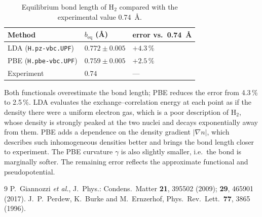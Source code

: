 \documentclass[11pt,a4paper]{article}
\begin{document}
\begin{table}[htb]
\centering
\caption{Equilibrium bond length of H$_2$ compared with the experimental value
\SI{0.74}{\angstrom}.}
\label{tab:compare}
\small
\begin{tabular}{l l l}
\toprule
Method & $b_\text{eq}$ (\si{\angstrom}) & error vs.\ \SI{0.74}{\angstrom} \\
\midrule
LDA (\texttt{H.pz-vbc.UPF})  & $0.772\pm0.005$ & $+4.3\,\%$ \\
PBE (\texttt{H.pbe-vbc.UPF}) & $0.759\pm0.005$ & $+2.5\,\%$ \\
Experiment                   & $0.74$          & --- \\
\bottomrule
\end{tabular}
\end{table}

Both functionals overestimate the bond length; PBE reduces the error from 4.3\,\% to 2.5\,\%. LDA
evaluates the exchange--correlation energy at each point as if the density there were a uniform
electron gas, which is a poor description of H$_2$, whose density is strongly peaked at the two
nuclei and decays exponentially away from them. PBE adds a dependence on the density gradient
$|\nabla n|$, which describes such inhomogeneous densities better and brings the bond length closer
to experiment. The PBE curvature $\gamma$ is also slightly smaller, i.e.\ the bond is marginally
softer. The remaining error reflects the approximate functional and pseudopotential.

\begin{thebibliography}{9}\footnotesize\setlength{\itemsep}{0pt}
 P.~Giannozzi \emph{et al.}, J.\ Phys.: Condens.\ Matter \textbf{21}, 395502 (2009);
  \textbf{29}, 465901 (2017).
 J.~P.~Perdew, K.~Burke and M.~Ernzerhof, Phys.\ Rev.\ Lett.\ \textbf{77}, 3865 (1996).
\end{thebibliography}
\end{document}
